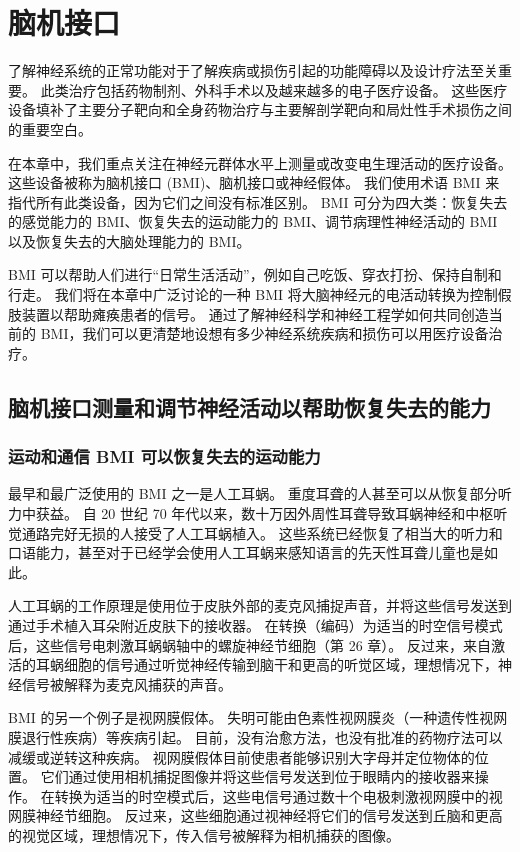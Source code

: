 \chapter{脑机接口} \label{chap:chap39}
了解神经系统的正常功能对于了解疾病或损伤引起的功能障碍以及设计疗法至关重要。 此类治疗包括药物制剂、外科手术以及越来越多的电子医疗设备。 这些医疗设备填补了主要分子靶向和全身药物治疗与主要解剖学靶向和局灶性手术损伤之间的重要空白。

在本章中，我们重点关注在神经元群体水平上测量或改变电生理活动的医疗设备。 这些设备被称为脑机接口 (BMI)、脑机接口或神经假体。 我们使用术语 BMI 来指代所有此类设备，因为它们之间没有标准区别。 BMI 可分为四大类：恢复失去的感觉能力的 BMI、恢复失去的运动能力的 BMI、调节病理性神经活动的 BMI 以及恢复失去的大脑处理能力的 BMI。

BMI 可以帮助人们进行“日常生活活动”，例如自己吃饭、穿衣打扮、保持自制和行走。 我们将在本章中广泛讨论的一种 BMI 将大脑神经元的电活动转换为控制假肢装置以帮助瘫痪患者的信号。 通过了解神经科学和神经工程学如何共同创造当前的 BMI，我们可以更清楚地设想有多少神经系统疾病和损伤可以用医疗设备治疗。

\section{脑机接口测量和调节神经活动以帮助恢复失去的能力}
\subsection{运动和通信 BMI 可以恢复失去的运动能力}
最早和最广泛使用的 BMI 之一是人工耳蜗。 重度耳聋的人甚至可以从恢复部分听力中获益。 自 20 世纪 70 年代以来，数十万因外周性耳聋导致耳蜗神经和中枢听觉通路完好无损的人接受了人工耳蜗植入。 这些系统已经恢复了相当大的听力和口语能力，甚至对于已经学会使用人工耳蜗来感知语言的先天性耳聋儿童也是如此。

人工耳蜗的工作原理是使用位于皮肤外部的麦克风捕捉声音，并将这些信号发送到通过手术植入耳朵附近皮肤下的接收器。 在转换（编码）为适当的时空信号模式后，这些信号电刺激耳蜗蜗轴中的螺旋神经节细胞（第 26 章）。 反过来，来自激活的耳蜗细胞的信号通过听觉神经传输到脑干和更高的听觉区域，理想情况下，神经信号被解释为麦克风捕获的声音。

BMI 的另一个例子是视网膜假体。 失明可能由色素性视网膜炎（一种遗传性视网膜退行性疾病）等疾病引起。 目前，没有治愈方法，也没有批准的药物疗法可以减缓或逆转这种疾病。 视网膜假体目前使患者能够识别大字母并定位物体的位置。 它们通过使用相机捕捉图像并将这些信号发送到位于眼睛内的接收器来操作。 在转换为适当的时空模式后，这些电信号通过数十个电极刺激视网膜中的视网膜神经节细胞。 反过来，这些细胞通过视神经将它们的信号发送到丘脑和更高的视觉区域，理想情况下，传入信号被解释为相机捕获的图像。


